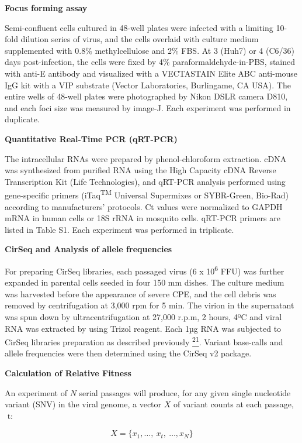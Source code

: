 \documentclass[
]{article}
\begin{document}
\textbf{Focus forming assay}

Semi-confluent cells cultured in 48-well plates were infected with a
limiting 10-fold dilution series of virus, and the cells overlaid with
culture medium supplemented with 0.8\% methylcellulose and 2\% FBS. At 3
(Huh7) or 4 (C6/36) days post-infection, the cells were fixed by 4\%
paraformaldehyde-in-PBS, stained with anti-E antibody and visualized
with a VECTASTAIN Elite ABC anti-mouse IgG kit with a VIP substrate
(Vector Laboratories, Burlingame, CA USA). The entire wells of 48-well
plates were photographed by Nikon DSLR camera D810, and each foci size
was measured by image-J. Each experiment was performed in duplicate.

\textbf{Quantitative Real-Time PCR (qRT-PCR)}

The intracellular RNAs were prepared by phenol-chloroform extraction.
cDNA was synthesized from purified RNA using the High Capacity cDNA
Reverse Transcription Kit (Life Technologies), and qRT-PCR analysis
performed using gene-specific primers (iTaq\textsuperscript{TM}
Universal Supermixes or SYBR-Green, Bio-Rad) according to manufacturers'
protocols. Ct values were normalized to GAPDH mRNA in human cells or 18S
rRNA in mosquito cells. qRT-PCR primers are listed in Table S1. Each
experiment was performed in triplicate.

\textbf{CirSeq and Analysis of allele frequencies}

For preparing CirSeq libraries, each passaged virus (6 x
10\textsuperscript{6} FFU) was further expanded in parental cells seeded
in four 150 mm dishes. The culture medium was harvested before the
appearance of severe CPE, and the cell debris was removed by
centrifugation at 3,000 rpm for 5 min. The virion in the supernatant was
spun down by ultracentrifugation at 27,000 r.p.m, 2 hours, 4ºC and viral
RNA was extracted by using Trizol reagent. Each 1µg RNA was subjected to
CirSeq libraries preparation as described previously
\href{https://paperpile.com/c/REZjPf/CObqp}{\textsuperscript{21}}.
Variant base-calls and allele frequencies were then determined using the
CirSeq v2 package.

\textbf{Calculation of Relative Fitness}

An experiment of \(N\) serial passages will produce, for any given
single nucleotide variant (SNV) in the viral genome, a vector \(X\) of
variant counts at each passage,\(\text{\ t}\):

\[X = \{ x_{1},\ldots,\ x_{t},\ \ldots,x_{N}\}\]
\end{document}
